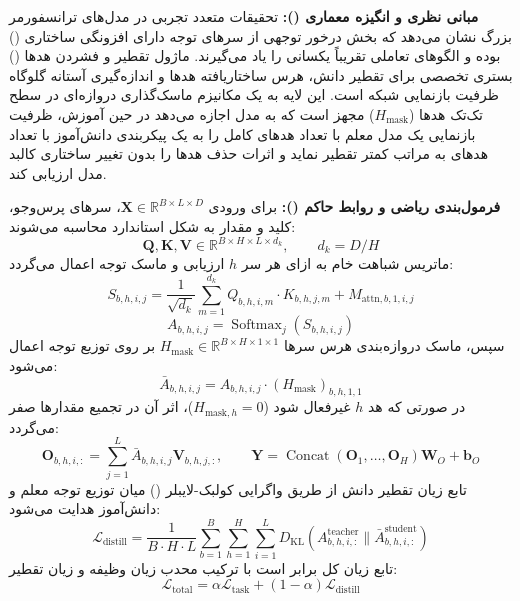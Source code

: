 \textbf{مبانی نظری و انگیزه معماری ():}
تحقیقات متعدد تجربی در مدل‌های ترانسفورمر بزرگ نشان می‌دهد که بخش درخور توجهی از سرهای توجه دارای افزونگی ساختاری () بوده و الگوهای تعاملی تقریباً یکسانی را یاد می‌گیرند. ماژول تقطیر و فشردن هدها () بستری تخصصی برای تقطیر دانش، هرس ساختاریافته هدها و اندازه‌گیری آستانه گلوگاه ظرفیت بازنمایی شبکه است.
این لایه به یک مکانیزم ماسک‌گذاری دروازه‌ای در سطح تک‌تک هدها ($H_{\text{mask}}$) مجهز است که به مدل اجازه می‌دهد در حین آموزش، ظرفیت بازنمایی یک مدل معلم با تعداد هدهای کامل را به یک پیکربندی دانش‌آموز با تعداد هدهای به مراتب کمتر تقطیر نماید و اثرات حذف هدها را بدون تغییر ساختاری کالبد مدل ارزیابی کند.

\textbf{فرمول‌بندی ریاضی و روابط حاکم ():}
برای ورودی $\mathbf{X} \in \mathbb{R}^{B \times L \times D}$، سرهای پرس‌وجو، کلید و مقدار به شکل استاندارد محاسبه می‌شوند:
\begin{equation}
\mathbf{Q}, \mathbf{K}, \mathbf{V} \in \mathbb{R}^{B \times H \times L \times d_k}, \qquad d_k = D / H
\end{equation}
ماتریس شباهت خام به ازای هر سر $h$ ارزیابی و ماسک توجه اعمال می‌گردد:
\begin{equation}
S_{b, h, i, j} = \frac{1}{\sqrt{d_k}} \sum_{m=1}^{d_k} Q_{b, h, i, m} \cdot K_{b, h, j, m} + M_{\text{attn}, b, 1, i, j}
\end{equation}
\begin{equation}
A_{b, h, i, j} = \operatorname{Softmax}_j(S_{b, h, i, j})
\end{equation}
سپس، ماسک دروازه‌بندی هرس سرها $H_{\text{mask}} \in \mathbb{R}^{B \times H \times 1 \times 1}$ بر روی توزیع توجه اعمال می‌شود:
\begin{equation}
\bar{A}_{b, h, i, j} = A_{b, h, i, j} \cdot (H_{\text{mask}})_{b, h, 1, 1}
\end{equation}
در صورتی که هد $h$ غیرفعال شود ($H_{\text{mask}, h} = 0$)، اثر آن در تجمیع مقدارها صفر می‌گردد:
\begin{equation}
\mathbf{O}_{b, h, i, :} = \sum_{j=1}^L \bar{A}_{b, h, i, j} \mathbf{V}_{b, h, j, :}, \qquad \mathbf{Y} = \operatorname{Concat}(\mathbf{O}_1, \dots, \mathbf{O}_H) \mathbf{W}_O + \mathbf{b}_O
\end{equation}
تابع زیان تقطیر دانش از طریق واگرایی کولبک-لایبلر () میان توزیع توجه معلم و دانش‌آموز هدایت می‌شود:
\begin{equation}
\mathcal{L}_{\text{distill}} = \frac{1}{B \cdot H \cdot L} \sum_{b=1}^B \sum_{h=1}^H \sum_{i=1}^L D_{\text{KL}}\left(A_{b, h, i, :}^{\text{teacher}} \parallel \bar{A}_{b, h, i, :}^{\text{student}}\right)
\end{equation}
تابع زیان کل برابر است با ترکیب محدب زیان وظیفه و زیان تقطیر:
\begin{equation}
\mathcal{L}_{\text{total}} = \alpha \mathcal{L}_{\text{task}} + (1 - \alpha) \mathcal{L}_{\text{distill}}
\end{equation}

